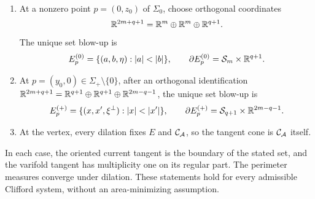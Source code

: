 \begin{proposition}
\label{prop:tangent-cones}
\leavevmode
\begin{enumerate}[label=\textup{(\roman*)}]
\item At a nonzero point $p=(0,z_0)$ of $\Sigma_0$, choose orthogonal
coordinates
\[
 \mathbb R^{2m+q+1}=\mathbb R^m\oplus\mathbb R^m\oplus\mathbb R^{q+1}.
\]
The unique set blow-up is
\begin{equation}\label{eq:tangent-Sigma0}
 E_p^{(0)}=\{(a,b,\eta):|a|<|b|\},\qquad
 \partial E_p^{(0)}=\mathcal S_m\times\R^{q+1}.
\end{equation}
\item At $p=(y_0,0)\in\Sigma_+\setminus\{0\}$, after an orthogonal
identification
$\mathbb R^{2m+q+1}=\mathbb R^{q+1}\oplus\mathbb R^{q+1}
 \oplus\mathbb R^{2m-q-1}$, the unique set blow-up is
\begin{equation}\label{eq:tangent-Sigmaplus}
 E_p^{(+)}=\{(x,x',\xi^\perp):|x|<|x'|\},\qquad
 \partial E_p^{(+)}
 =\mathcal S_{q+1}\times\R^{2m-q-1}.
\end{equation}
\item At the vertex, every dilation fixes $E$ and $\mathcal C_{\mathcal A}$, so the
tangent cone is $\mathcal C_{\mathcal A}$ itself.
\end{enumerate}
In each case, the oriented current tangent is the boundary of the
stated set, and the varifold tangent has multiplicity one on its regular
part.  The perimeter measures converge under dilation.  These statements
hold for every admissible Clifford system, without an area-minimizing
assumption.
\end{proposition}

